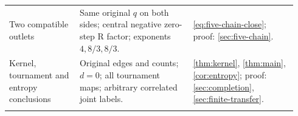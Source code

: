 \begin{longtable}{@{}p{0.23\linewidth}p{0.37\linewidth}p{0.34\linewidth}@{}}
\addlinespace[2pt]
Two compatible outlets & Same original $q$ on both sides; central negative zero-step R factor; exponents $4,8/3,8/3$. & \eqref{eq:five-chain-close}; proof: \ref{sec:five-chain}. \\
\addlinespace[2pt]
Kernel, tournament and entropy conclusions & Original edges and counts; $d=0$; all tournament maps; arbitrary correlated joint labels. & \ref{thm:kernel}, \ref{thm:main}, \ref{cor:entropy}; proof: \ref{sec:completion}, \ref{sec:finite-transfer}. \\
\addlinespace[2pt]
\end{longtable}
\endgroup
